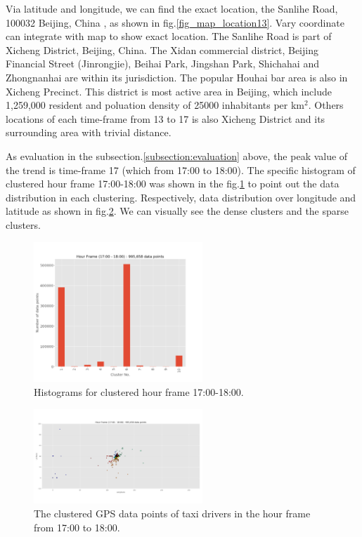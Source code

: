 \documentclass[journal]{IEEEtran}
\begin{document}
Via latitude and longitude, we can find the exact location, the Sanlihe Road, 100032 Beijing, China , as shown in fig.\ref{fig_map_location13}. Vary coordinate can integrate with map to show exact location. The Sanlihe Road is part of Xicheng District, Beijing, China. The Xidan commercial district, Beijing Financial Street (Jinrongjie), Beihai Park, Jingshan Park, Shichahai and Zhongnanhai are within its jurisdiction. The popular Houhai bar area is also in Xicheng Precinct. This district is most active area in Beijing, which include 1,259,000 resident and poluation density of 25000 inhabitants per km$^2$. Others locations of each time-frame from 13 to 17 is also Xicheng District and its surrounding area with trivial distance. 

As evaluation in the subsection.\ref{subsection:evaluation} above, the peak value of the trend is time-frame 17 (which from 17:00 to 18:00). The specific histogram of clustered hour frame 17:00-18:00 was shown in the fig.\ref{fig_histogram} to point out the data distribution in each clustering. Respectively, data distribution over longitude and latitude as shown in fig.\ref{fig_scatter17}. We can visually see the dense clusters and the sparse clusters.

\begin{figure}[!t]
	\centering
	\includegraphics[width=2.5in]{image/Histogram17.png}
	\caption{Histograms for clustered hour frame 17:00-18:00.}
	\label{fig_histogram}
\end{figure}

\begin{figure}[!t]
	\centering
	\includegraphics[width=2.5in]{image/Scatter17.png}
	\caption{The clustered GPS data points of taxi drivers in the hour frame from 17:00 to 18:00.}
	\label{fig_scatter17}
\end{figure}
\end{document}
